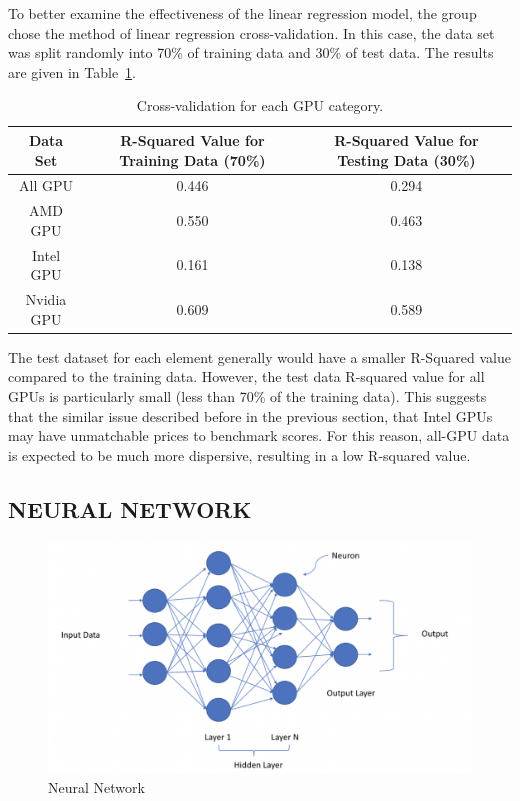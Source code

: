 \documentclass{scrartcl}
\begin{document}
To better examine the effectiveness of the linear regression model, the group chose the method of linear regression cross-validation. In this case, the data set was split randomly into 70\% of training data and 30\% of test data. The results are given in Table~\ref{tab:CRSV}. 

\begin{table}[h!]
\centering
\begin{tabular}{|c | c | c|} 
 \hline
Data Set & R-Squared Value for Training Data (70\%) & R-Squared Value for Testing Data (30\%)\\ [0.5ex] 
 \hline\hline
 All GPU & 0.446 & 0.294 \\ 
 AMD GPU & 0.550 & 0.463 \\
 Intel GPU & 0.161 & 0.138 \\ 
 Nvidia GPU & 0.609 & 0.589 \\ [1ex] 
 \hline
\end{tabular}
\caption{Cross-validation for each GPU category.}
\label{tab:CRSV}
\end{table}

\noindent The test dataset for each element generally would have a smaller R-Squared value compared to the training data. However, the test data R-squared value for all GPUs is particularly small (less than 70\% of the training data). This suggests that the similar issue described before in the previous section, that Intel GPUs may have unmatchable prices to benchmark scores. For this reason, all-GPU data is expected to be much more dispersive, resulting in a low R-squared value. 



\subsection{NEURAL NETWORK}

\begin{figure}[H]
	\begin{center}
		\includegraphics[scale=0.3]{Graphics/Neural Network Images/NN1.png}
	\end{center}
	\caption{Neural Network}
	\label{fig:NN1}
\end{figure}
\end{document}
